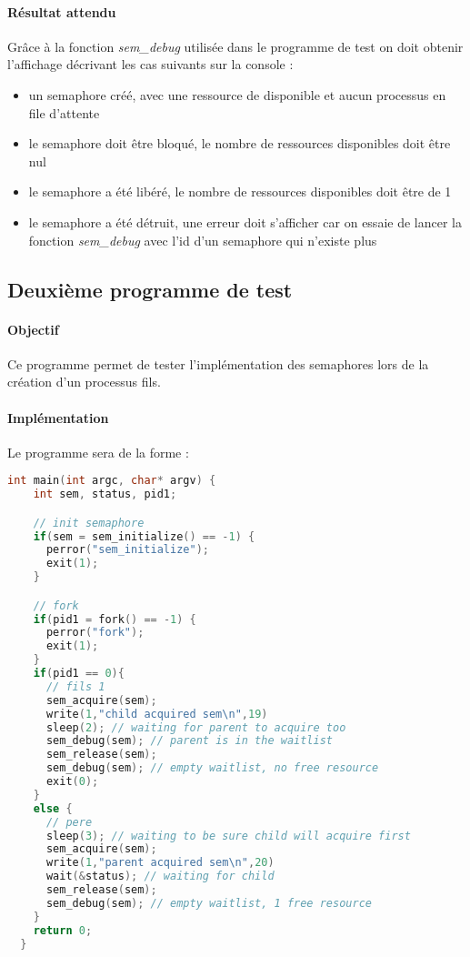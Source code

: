 \documentclass[12pt]{article}
\begin{document}
  \paragraph{Résultat attendu\\}
  Grâce à la fonction \textit{sem\_debug} utilisée dans le programme de test on doit obtenir l'affichage décrivant les cas suivants sur la console :
  \begin{itemize}
    \item un semaphore créé, avec une ressource de disponible et aucun processus en file d'attente
    \item le semaphore doit être bloqué, le nombre de ressources disponibles doit être nul
    \item le semaphore a été libéré, le nombre de ressources disponibles doit être de 1
    \item le semaphore a été détruit, une erreur doit s'afficher car on essaie de lancer la fonction \textit{sem\_debug} avec l'id d'un semaphore qui n'existe plus
  \end{itemize}

  \newpage
  \subsection{Deuxième programme de test}
  \paragraph{Objectif\\}
  Ce programme permet de tester l'implémentation des semaphores lors de la création d'un processus fils.
  \paragraph{Implémentation\\}
  Le programme sera de la forme :
  \begin{lstlisting}[language=C]
  int main(int argc, char* argv) {
    int sem, status, pid1;

    // init semaphore
    if(sem = sem_initialize() == -1) {
      perror("sem_initialize");
      exit(1);
    }

    // fork
    if(pid1 = fork() == -1) {
      perror("fork");
      exit(1);
    }
    if(pid1 == 0){
      // fils 1
      sem_acquire(sem);
      write(1,"child acquired sem\n",19)
      sleep(2); // waiting for parent to acquire too
      sem_debug(sem); // parent is in the waitlist
      sem_release(sem);
      sem_debug(sem); // empty waitlist, no free resource
      exit(0);
    }
    else {
      // pere
      sleep(3); // waiting to be sure child will acquire first
      sem_acquire(sem);
      write(1,"parent acquired sem\n",20)
      wait(&status); // waiting for child
      sem_release(sem);
      sem_debug(sem); // empty waitlist, 1 free resource
    }
    return 0;
  }
  \end{lstlisting}
\end{document}
